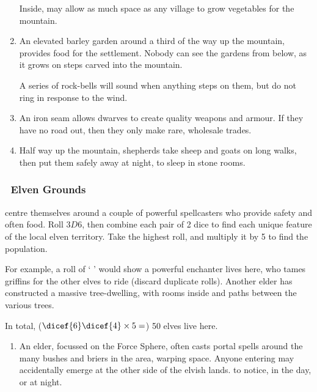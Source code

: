 \begin{multicols}{2}
\begin{enumerate}
  Inside, may allow as much space as any \gls{village} to grow vegetables for the mountain.
  \item
  An elevated barley garden around a third of the way up the mountain, provides food for the settlement.
  Nobody can see the gardens from below, as it grows on steps carved into the mountain.

  A series of rock-bells will sound when anything steps on them, but do not ring in response to the wind.
  \item
  An iron seam allows dwarves to create quality weapons and armour.
  If they have no road out, then they only make rare, wholesale trades.
  \item
  Half way up the mountain, shepherds take sheep and goats on long walks, then put them safely away at night, to sleep in stone rooms.
\end{enumerate}

\subsubsection[Elven Grounds]{\El\ Elven Grounds}
\label{elvesPoint}
centre themselves around a couple of powerful spellcasters who provide safety and often food.
Roll $3D6$, then combine each pair of 2 dice to find each unique feature of the local elven territory.
Take the highest roll, and multiply it by 5 to find the population.

\begin{exampletext}
  For example, a roll of `  ' would show a powerful enchanter lives here, who tames griffins for the other elves to ride
  (discard duplicate rolls).
  Another elder has constructed a massive tree-dwelling, with rooms inside and paths between the various trees.

  In total, ($\dicef{6}\dicef{4}\times 5 =$) 50 elves live here.


\end{exampletext}

\begin{enumerate}
  \item
  An elder, focussed on the Force Sphere, often casts portal spells around the many bushes and briers in the area, warping space.
  Anyone entering may accidentally emerge at the other side of the elvish lands.
   to notice, \tn[7] in the day, or \tn[12] at night.


\end{enumerate}
\end{multicols}
